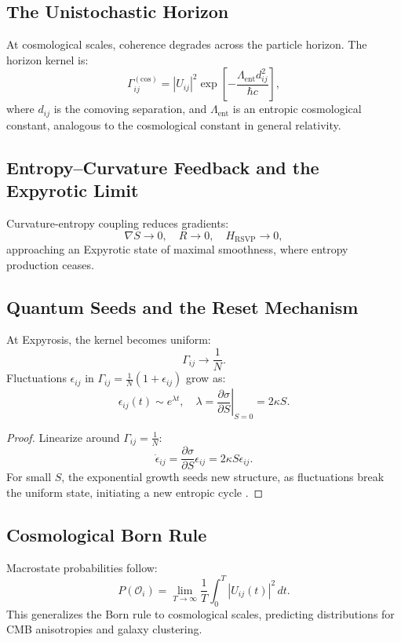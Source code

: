 \documentclass[12pt]{article}
\begin{document}
{\subsection{The Unistochastic Horizon}

At cosmological scales, coherence degrades across the particle horizon. The horizon kernel is:
\[
\Gamma_{ij}^{(\mathrm{cos})} = |U_{ij}|^2 \exp\left[ -\frac{\Lambda_{\mathrm{ent}} d_{ij}^2}{\hbar c} \right],
\]
where \(d_{ij}\) is the comoving separation, and \(\Lambda_{\mathrm{ent}}\) is an entropic cosmological constant, analogous to the cosmological constant in general relativity.

\subsection{Entropy–Curvature Feedback and the Expyrotic Limit}

Curvature-entropy coupling reduces gradients:
\[
\nabla S \to 0, \quad R \to 0, \quad H_{\mathrm{RSVP}} \to 0,
\]
approaching an Expyrotic state of maximal smoothness, where entropy production ceases.

\subsection{Quantum Seeds and the Reset Mechanism}

At Expyrosis, the kernel becomes uniform:
\[
\Gamma_{ij} \to \frac{1}{N}.
\]
Fluctuations \(\epsilon_{ij}\) in \(\Gamma_{ij} = \frac{1}{N} (1 + \epsilon_{ij})\) grow as:
\[
\epsilon_{ij}(t) \sim e^{\lambda t}, \quad \lambda = \left. \frac{\partial \sigma}{\partial S} \right|_{S=0} = 2 \kappa S.
\]

\begin{proof}
Linearize around \(\Gamma_{ij} = \frac{1}{N}\):
\[
\dot{\epsilon}_{ij} = \frac{\partial \sigma}{\partial S} \epsilon_{ij} = 2 \kappa S \epsilon_{ij}.
\]
For small \(S\), the exponential growth seeds new structure, as fluctuations break the uniform state, initiating a new entropic cycle \cite{Seifert2012}.
\end{proof}

\subsection{Cosmological Born Rule}

Macrostate probabilities follow:
\[
P(\mathcal{O}_i) = \lim_{T \to \infty} \frac{1}{T} \int_0^T |U_{ij}(t)|^2 \, dt.
\]
This generalizes the Born rule to cosmological scales, predicting distributions for CMB anisotropies and galaxy clustering.

}
\end{document}

